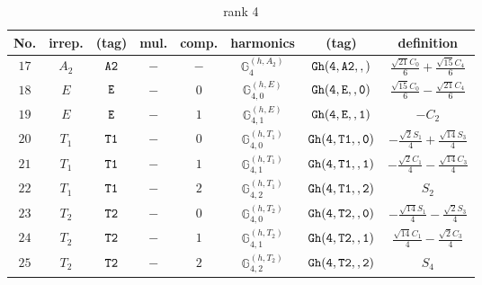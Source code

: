 \documentclass[fleqn,8pt]{jsarticle}
\begin{document}
\begin{table}[ht!]
\begin{center}
\caption{rank 4}
\renewcommand{\arraystretch}{1.3}
\begin{tabular}{cccccccc} \hline \hline
No. & irrep. & (tag) & mul. & comp. & harmonics & (tag) & definition \\ \hline
$ 17 $ & $ A_{2} $ & $ {\tt A2} $ & $ - $ & $ - $ & $ \mathbb{G}_{4}^{(h,A_{2})} $ & $ {\tt Gh(4,A2,,)} $ & $ \frac{\sqrt{21} C_{0}}{6} + \frac{\sqrt{15} C_{4}}{6} $ \\
$ 18 $ & $ E $ & $ {\tt E} $ & $ - $ & $ 0 $ & $ \mathbb{G}_{4,0}^{(h,E)} $ & $ {\tt Gh(4,E,,0)} $ & $ \frac{\sqrt{15} C_{0}}{6} - \frac{\sqrt{21} C_{4}}{6} $ \\
$ 19 $ & $ E $ & $ {\tt E} $ & $ - $ & $ 1 $ & $ \mathbb{G}_{4,1}^{(h,E)} $ & $ {\tt Gh(4,E,,1)} $ & $ - C_{2} $ \\
$ 20 $ & $ T_{1} $ & $ {\tt T1} $ & $ - $ & $ 0 $ & $ \mathbb{G}_{4,0}^{(h,T_{1})} $ & $ {\tt Gh(4,T1,,0)} $ & $ - \frac{\sqrt{2} S_{1}}{4} + \frac{\sqrt{14} S_{3}}{4} $ \\
$ 21 $ & $ T_{1} $ & $ {\tt T1} $ & $ - $ & $ 1 $ & $ \mathbb{G}_{4,1}^{(h,T_{1})} $ & $ {\tt Gh(4,T1,,1)} $ & $ - \frac{\sqrt{2} C_{1}}{4} - \frac{\sqrt{14} C_{3}}{4} $ \\
$ 22 $ & $ T_{1} $ & $ {\tt T1} $ & $ - $ & $ 2 $ & $ \mathbb{G}_{4,2}^{(h,T_{1})} $ & $ {\tt Gh(4,T1,,2)} $ & $ S_{2} $ \\
$ 23 $ & $ T_{2} $ & $ {\tt T2} $ & $ - $ & $ 0 $ & $ \mathbb{G}_{4,0}^{(h,T_{2})} $ & $ {\tt Gh(4,T2,,0)} $ & $ - \frac{\sqrt{14} S_{1}}{4} - \frac{\sqrt{2} S_{3}}{4} $ \\
$ 24 $ & $ T_{2} $ & $ {\tt T2} $ & $ - $ & $ 1 $ & $ \mathbb{G}_{4,1}^{(h,T_{2})} $ & $ {\tt Gh(4,T2,,1)} $ & $ \frac{\sqrt{14} C_{1}}{4} - \frac{\sqrt{2} C_{3}}{4} $ \\
$ 25 $ & $ T_{2} $ & $ {\tt T2} $ & $ - $ & $ 2 $ & $ \mathbb{G}_{4,2}^{(h,T_{2})} $ & $ {\tt Gh(4,T2,,2)} $ & $ S_{4} $ \\
 \hline \hline
\end{tabular}
\end{center}
\end{table}
\end{document}
